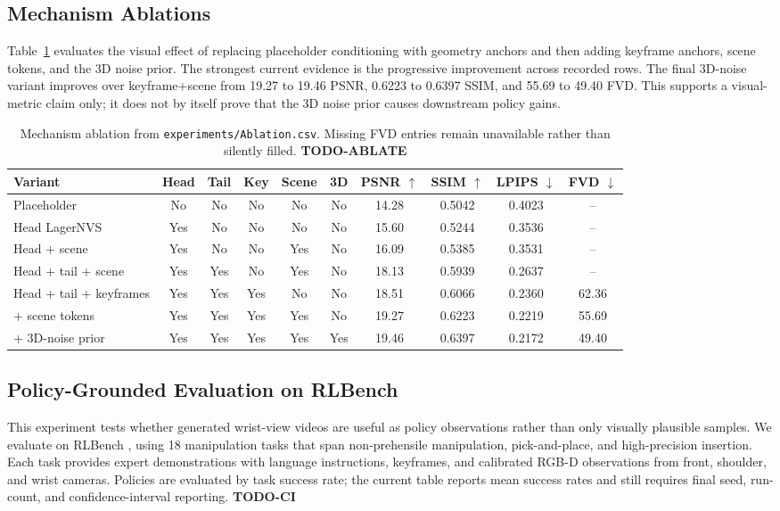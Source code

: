\documentclass[letterpaper]{article}
\newcommand{\todo}[1]{\textbf{TODO-#1}}
\begin{document}
\subsection{Mechanism Ablations}

Table~\ref{tab:ablation} evaluates the visual effect of replacing placeholder conditioning with geometry anchors and then adding keyframe anchors, scene tokens, and the 3D noise prior.
The strongest current evidence is the progressive improvement across recorded rows.
The final 3D-noise variant improves over keyframe+scene from 19.27 to 19.46 PSNR, 0.6223 to 0.6397 SSIM, and 55.69 to 49.40 FVD.
This supports a visual-metric claim only; it does not by itself prove that the 3D noise prior causes downstream policy gains.

\begin{table}[t]
\caption{Mechanism ablation from \texttt{experiments/Ablation.csv}. Missing FVD entries remain unavailable rather than silently filled. \todo{ABLATE}}
\label{tab:ablation}
\centering
\small
\begin{tabular}{lccccccccc}
\toprule
Variant & Head & Tail & Key & Scene & 3D & PSNR $\uparrow$ & SSIM $\uparrow$ & LPIPS $\downarrow$ & FVD $\downarrow$ \\
\midrule
Placeholder & No & No & No & No & No & 14.28 & 0.5042 & 0.4023 & -- \\
Head LagerNVS & Yes & No & No & No & No & 15.60 & 0.5244 & 0.3536 & -- \\
Head + scene & Yes & No & No & Yes & No & 16.09 & 0.5385 & 0.3531 & -- \\
Head + tail + scene & Yes & Yes & No & Yes & No & 18.13 & 0.5939 & 0.2637 & -- \\
Head + tail + keyframes & Yes & Yes & Yes & No & No & 18.51 & 0.6066 & 0.2360 & 62.36 \\
+ scene tokens & Yes & Yes & Yes & Yes & No & 19.27 & 0.6223 & 0.2219 & 55.69 \\
+ 3D-noise prior & Yes & Yes & Yes & Yes & Yes & 19.46 & 0.6397 & 0.2172 & 49.40 \\
\bottomrule
\end{tabular}
\end{table}

\subsection{Policy-Grounded Evaluation on RLBench}

This experiment tests whether generated wrist-view videos are useful as policy observations rather than only visually plausible samples.
We evaluate on RLBench \cite{james2019rlbench}, using 18 manipulation tasks that span non-prehensile manipulation, pick-and-place, and high-precision insertion.
Each task provides expert demonstrations with language instructions, keyframes, and calibrated RGB-D observations from front, shoulder, and wrist cameras.
Policies are evaluated by task success rate; the current table reports mean success rates and still requires final seed, run-count, and confidence-interval reporting. \todo{CI}
\end{document}
